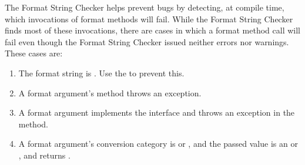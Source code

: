 %
%


The Format String Checker helps prevent bugs by detecting, at compile time,
which invocations of format methods will fail. While the Format String Checker
finds most of these invocations, there are cases in which a format method call
will fail even though the Format String Checker issued neither errors nor
warnings. These cases are:

\begin{enumerate}
\item The format string is . Use the  to prevent this.
\item A format argument's  method throws an exception.
\item A format argument implements the  interface and throws an
    exception in the  method.
\item A format argument's conversion category is  or ,
    and the passed value is an  or , and
     returns .
\end{enumerate}

